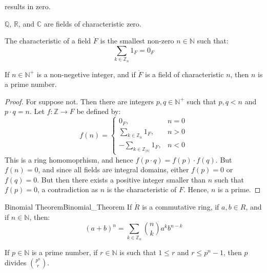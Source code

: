     results in zero.
    \begin{example}
        $\mathbb{Q}$, $\mathbb{R}$, and $\mathbb{C}$ are fields of
        characteristic zero.
    \end{example}
    \begin{definition}
        The characteristic of a field $\ring{F}$ is the smallest non-zero
        $n\in\mathbb{N}$ such that:
        \begin{equation}
            \sum_{k\in\mathbb{Z}_{n}}1_{F}=0_{F}
        \end{equation}
    \end{definition}
    \begin{theorem}
        If $n\in\mathbb{N}^{+}$ is a non-negetive integer, and if
        $\ring{F}$ is a field of characteristic $n$, then $n$ is a prime
        number.
    \end{theorem}
    \begin{proof}
        For suppose not. Then there are integers $p,q\in\mathbb{N}^{+}$ such
        that $p,q<n$ and $p\cdot{q}=n$. Let $f:\mathbb{Z}\rightarrow{F}$ be
        defined by:
        \begin{equation}
            f(n)=
            \begin{cases}
                0_{F},&n=0\\
                \sum_{k\in\mathbb{Z}_{n}}1_{F},&n>0\\
                \minus\sum_{k\in\mathbb{Z}_{|n|}}1_{F},&n<0
            \end{cases}
        \end{equation}
        This is a ring homomoprhism, and hence
        $f(p\cdot{q})=f(p)\cdot{f}(q)$. But $f(n)=0$, and since all fields
        are integral domains, either $f(p)=0$ or $f(q)=0$. But then there
        exists a positive integer smaller than $n$ such that $f(p)=0$,
        a contradiction as $n$ is the characteristic of $F$. Hence, $n$ is
        a prime.
    \end{proof}
    \begin{ftheorem}{Binomial Theorem}{Binomial_Theorem}
        If $\ring{R}$ is a commutative ring, if $a,b\in{R}$, and if
        $n\in\mathbb{N}$, then:
        \begin{equation*}
            (a+b)^{n}=\sum_{k\in\mathbb{Z}_{n}}\binom{n}{k}a^{k}b^{n-k}
        \end{equation*}
    \end{ftheorem}
    \begin{theorem}
        If $p\in\mathbb{N}$ is a prime number, if $r\in\mathbb{N}$ is such
        that $1\leq{r}$ and $r\leq{p}^{n}-1$, then $p$ divides
        $\binom{p^{n}}{r}$.
    \end{theorem}
